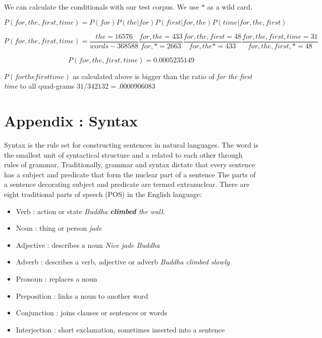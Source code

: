 We can calculate the conditionals with our test corpus.  We use $*$ as a wild card.

\[P(for, the, first, time) = P(for)  P(the | for)  P(first | for, the)  P(time | for, the, first)\]

\[P(for, the, first, time) =  \frac{the=16576}{words-368588}  \frac{for, the =433}{for, * = 2663} \frac{for, the, first =48}{for, the * = 433}  \frac{for, the, first, time  =31}{for, the, first, * = 48} \]

\[P(for, the, first, time) =  0.0005235149\]

$P(for the first time)$ as calculated above is bigger than the ratio of \emph{for the first time} to all quad-grams $31/342132 = .0000906083$

\section{Appendix : Syntax}
Syntax is the rule set for constructing sentences in natural languages.  The word is the smallest unit of syntactical structure and a related to each other through rules of grammar.  Traditionally, grammar and syntax dictate that every sentence has a subject and predicate that form the nuclear part of a sentence  The parts of a sentence decorating subject and predicate are termed extranuclear.
There are eight traditional parts of speech (POS) in the English language:
\begin{itemize}
  \item Verb : action or state \emph{Buddha \textbf{climbed} the wall.}
  \item Noun : thing or person \emph{jade}
  \item Adjective : describes a noun \emph{Nice jade Buddha}
  \item Adverb : describes a verb, adjective or adverb \emph{Buddha climbed slowly}
  \item Pronoun : replaces a noun
  \item Preposition : links a noun to another word
  \item Conjunction : joins clauses or sentences or words
  \item Interjection : short exclamation, sometimes inserted into a sentence
\end{itemize}

